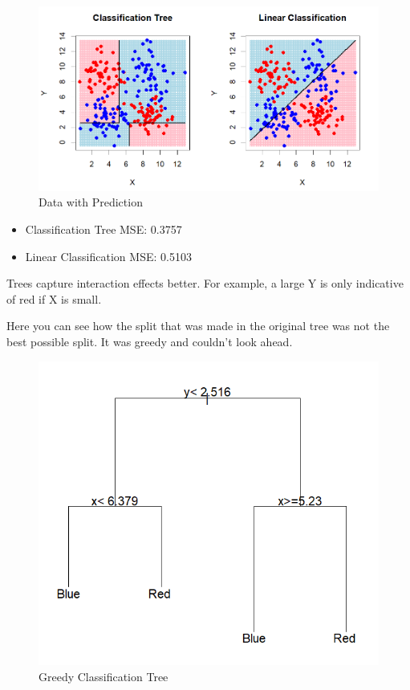 \documentclass[12pt]{article}
\begin{document}
\begin{figure}
    \centering
    \includegraphics[scale=0.50]{NLD Pred.png}
    \caption{Data with Prediction}
    \label{fig:sub2}  %
\end{figure}


\begin{itemize}
    \item Classification Tree MSE: 0.3757
    \item Linear Classification MSE: 0.5103
\end{itemize}

Trees capture interaction effects better. For example, a large Y is only indicative of red if X is small.




Here you can see how the split that was made in the original tree was not the best possible split. It was greedy and couldn't look ahead.



\begin{figure}
    \centering
    \includegraphics[scale=0.50]{Greedy Classification Tree.png}
    \caption{Greedy Classification Tree}
    \label{fig:sub3}  %
\end{figure}%
\end{document}
